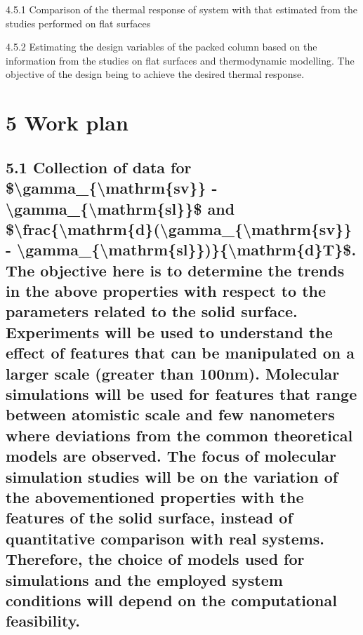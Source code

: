 \par 4.5.1 Comparison of the thermal response of system with that estimated from the studies performed on flat surfaces
\par 4.5.2 Estimating the design variables of the packed column based on the information from the studies on flat surfaces and thermodynamic modelling. The objective of the design being to achieve the desired thermal response.\section{5 Work plan}
\subsection{5.1 Collection of data for \$\textbackslash gamma\_\{\textbackslash mathrm\{sv\}\} - \textbackslash gamma\_\{\textbackslash mathrm\{sl\}\}\$ and \$\textbackslash frac\{\textbackslash mathrm\{d\}(\textbackslash gamma\_\{\textbackslash mathrm\{sv\}\} - \textbackslash gamma\_\{\textbackslash mathrm\{sl\}\})\}\{\textbackslash mathrm\{d\}T\}\$. The objective here is to determine the trends in the above properties with respect to the parameters related to the solid surface. Experiments will be used to understand the effect of features that can be manipulated on a larger scale (greater than 100nm). Molecular simulations will be used for features that range between atomistic scale and few nanometers where deviations from the common theoretical models are observed. The focus of molecular simulation studies will be on the variation of the abovementioned properties with the features of the solid surface, instead of quantitative comparison with real systems. Therefore, the choice of models used for simulations and the employed system conditions will depend on the computational feasibility.}

